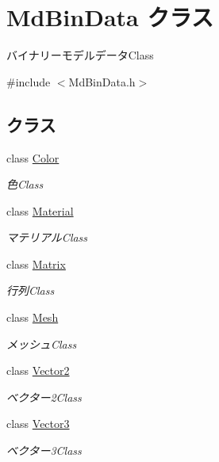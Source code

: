 \hypertarget{class_md_bin_data}{}\section{Md\+Bin\+Data クラス}
\label{class_md_bin_data}


バイナリーモデルデータ\+Class  




{\ttfamily \#include $<$Md\+Bin\+Data.\+h$>$}

\subsection*{クラス}
\begin{DoxyCompactItemize}
\item 
class \mbox{\hyperlink{class_md_bin_data_1_1_color}{Color}}
\begin{DoxyCompactList}\small\item\em 色\+Class \end{DoxyCompactList}\item 
class \mbox{\hyperlink{class_md_bin_data_1_1_material}{Material}}
\begin{DoxyCompactList}\small\item\em マテリアル\+Class \end{DoxyCompactList}\item 
class \mbox{\hyperlink{class_md_bin_data_1_1_matrix}{Matrix}}
\begin{DoxyCompactList}\small\item\em 行列\+Class \end{DoxyCompactList}\item 
class \mbox{\hyperlink{class_md_bin_data_1_1_mesh}{Mesh}}
\begin{DoxyCompactList}\small\item\em メッシュ\+Class \end{DoxyCompactList}\item 
class \mbox{\hyperlink{class_md_bin_data_1_1_vector2}{Vector2}}
\begin{DoxyCompactList}\small\item\em ベクター2\+Class \end{DoxyCompactList}\item 
class \mbox{\hyperlink{class_md_bin_data_1_1_vector3}{Vector3}}
\begin{DoxyCompactList}\small\item\em ベクター3\+Class \end{DoxyCompactList}\end{DoxyCompactItemize}
